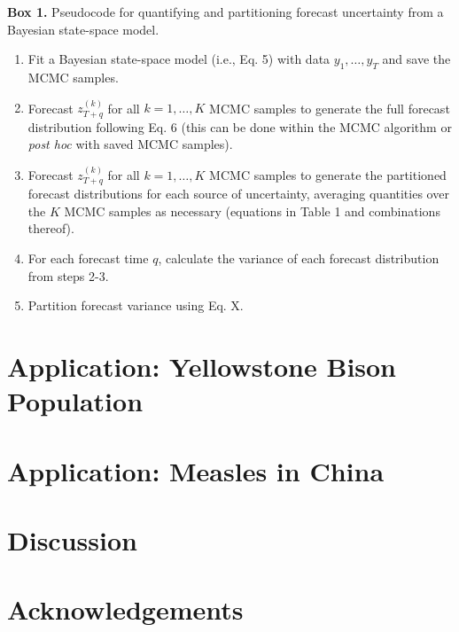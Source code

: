 \documentclass[12pt,]{article}
\begin{document}
\begin{Box}
  \renewcommand{\arraystretch}{1.04}
  \caption{}
  \textbf{Box 1.} Pseudocode for quantifying and partitioning forecast uncertainty from a Bayesian state-space model. 
  \vspace{1em}
  \begin{enumerate}
    \item Fit a Bayesian state-space model (i.e., Eq. 5) with data $y_1,\dots,y_T$ and save the MCMC samples.
    \item Forecast $z_{T+q}^{(k)}$ for all $k = 1,\dots,K$ MCMC samples to generate the full forecast distribution following Eq. 6 (this can be done within the MCMC algorithm or \emph{post hoc} with saved MCMC samples).
    \item Forecast $z_{T+q}^{(k)}$ for all $k = 1,\dots,K$ MCMC samples to generate the partitioned forecast distributions for each source of uncertainty, averaging quantities over the $K$ MCMC samples as necessary (equations in Table 1 and combinations thereof).
    \item For each forecast time $q$, calculate the variance of each forecast distribution from steps 2-3.
    \item Partition forecast variance using Eq. X.
  \end{enumerate}
  \renewcommand{\arraystretch}{1.0}
\end{Box}

\hypertarget{application-yellowstone-bison-population}{%
\section{Application: Yellowstone Bison
Population}\label{application-yellowstone-bison-population}}

\hypertarget{application-measles-in-china}{%
\section{Application: Measles in
China}\label{application-measles-in-china}}

\hypertarget{discussion}{%
\section{Discussion}\label{discussion}}

\hypertarget{acknowledgements}{%
\section{Acknowledgements}\label{acknowledgements}}
\end{document}
